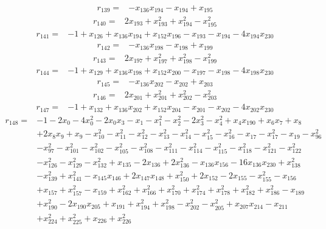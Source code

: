 \[\begin{aligned}
r_{139}={}&-x_{136}x_{194}-x_{194}+x_{195}
\end{aligned}\]
\[\begin{aligned}
r_{140}={}&2x_{193}+x_{193}^{2}+x_{194}^{2}-x_{195}^{2}
\end{aligned}\]
\[\begin{aligned}
r_{141}={}&-1+x_{126}+x_{136}x_{194}+x_{152}x_{196}-x_{193}-x_{194}-4x_{194}x_{230}
\end{aligned}\]
\[\begin{aligned}
r_{142}={}&-x_{136}x_{198}-x_{198}+x_{199}
\end{aligned}\]
\[\begin{aligned}
r_{143}={}&2x_{197}+x_{197}^{2}+x_{198}^{2}-x_{199}^{2}
\end{aligned}\]
\[\begin{aligned}
r_{144}={}&-1+x_{129}+x_{136}x_{198}+x_{152}x_{200}-x_{197}-x_{198}-4x_{198}x_{230}
\end{aligned}\]
\[\begin{aligned}
r_{145}={}&-x_{136}x_{202}-x_{202}+x_{203}
\end{aligned}\]
\[\begin{aligned}
r_{146}={}&2x_{201}+x_{201}^{2}+x_{202}^{2}-x_{203}^{2}
\end{aligned}\]
\[\begin{aligned}
r_{147}={}&-1+x_{132}+x_{136}x_{202}+x_{152}x_{204}-x_{201}-x_{202}-4x_{202}x_{230}
\end{aligned}\]
\[\begin{aligned}
r_{148}={}&-1-2x_{0}-4x_{0}^{2}-2x_{0}x_{3}-x_{1}-x_{1}^{2}-x_{2}^{2}-2x_{3}^{2}-x_{4}^{2}+x_{4}x_{190}+x_{6}x_{7}+x_{8}
\\ &+2x_{8}x_{9}+x_{9}-x_{10}^{2}-x_{11}^{2}-x_{12}^{2}-x_{13}^{2}-x_{14}^{2}-x_{15}^{2}-x_{16}^{2}-x_{17}-x_{17}^{2}-x_{19}-x_{96}^{2}
\\ &-x_{97}^{2}-x_{101}^{2}-x_{102}^{2}-x_{105}^{2}-x_{108}^{2}-x_{111}^{2}-x_{114}^{2}-x_{115}^{2}-x_{118}^{2}-x_{121}^{2}-x_{122}^{2}
\\ &-x_{126}^{2}-x_{129}^{2}-x_{132}^{2}+x_{135}-2x_{136}+2x_{136}^{2}-x_{136}x_{156}-16x_{136}x_{230}+x_{138}^{2}
\\ &-x_{139}^{2}+x_{141}^{2}-x_{145}x_{146}+2x_{147}x_{148}+x_{150}^{2}+2x_{152}-2x_{155}-x_{155}^{2}-x_{156}
\\ &+x_{157}+x_{157}^{2}-x_{159}+x_{162}^{2}+x_{166}^{2}+x_{170}^{2}+x_{174}^{2}+x_{178}^{2}+x_{182}^{2}+x_{186}^{2}-x_{189}
\\ &+x_{190}^{2}-2x_{190}x_{205}+x_{191}+x_{194}^{2}+x_{198}^{2}-x_{202}^{2}-x_{205}^{2}+x_{207}x_{214}-x_{211}
\\ &+x_{224}^{2}+x_{225}^{2}+x_{226}+x_{226}^{2}
\end{aligned}\]
